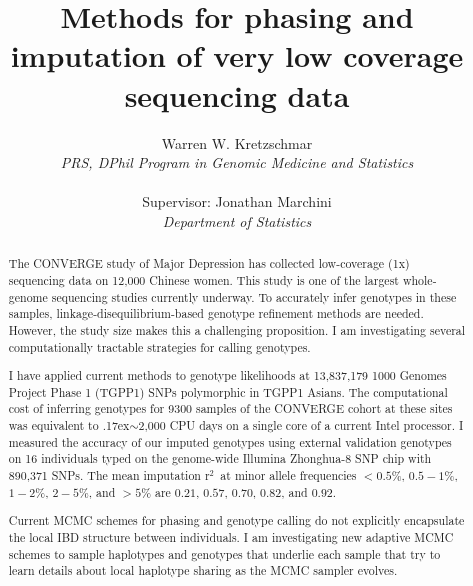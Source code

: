 \documentclass[a4paper]{article}
\newcommand{\rsq}{$\mbox{r}^2$~}
\newcommand{\ttilde}{\raise.17ex\hbox{$\scriptstyle\sim$}}
\begin{document}
\title{Methods for phasing and imputation of very low coverage sequencing data}
\author{Warren W. Kretzschmar\\
 \emph{PRS, DPhil Program in Genomic Medicine and Statistics}\\
 \\
  Supervisor: Jonathan Marchini\\
  \emph{Department of Statistics}}

\maketitle


\begin{abstract}

  The CONVERGE study of Major Depression has collected low-coverage (1x)
  sequencing data on 12,000 Chinese women. This study is one of the
  largest whole-genome sequencing studies currently underway. To
  accurately infer genotypes in these samples, linkage-disequilibrium-based genotype
  refinement methods are needed.  However, the study size makes this a
  challenging proposition. I am investigating several computationally
  tractable strategies for calling genotypes.

  I have applied current methods to genotype likelihoods at 13,837,179
  1000 Genomes Project Phase 1 (TGPP1) SNPs polymorphic in TGPP1
  Asians. The computational cost of inferring genotypes for 9300 samples
  of the CONVERGE cohort at these sites was equivalent to \ttilde{}2,000 CPU days on a single core
  of a current Intel processor. I measured the accuracy of our
  imputed genotypes using external validation genotypes on 16
  individuals typed on the genome-wide Illumina Zhonghua-8 SNP chip with
  890,371 SNPs. The mean imputation \rsq at minor allele
  frequencies $<0.5\%$,
  $0.5-1\%$, $1-2\%$, $2-5\%$, and $>5\%$ are $0.21$, $0.57$, $0.70$, $0.82$, and
  $0.92$.

  Current MCMC schemes for
  phasing and genotype calling do not explicitly encapsulate the local
  IBD structure between individuals. I am investigating new adaptive
  MCMC schemes to sample haplotypes and genotypes that underlie each
  sample that try to learn details about local haplotype sharing as the
  MCMC sampler evolves.

\end{abstract}
\end{document}
